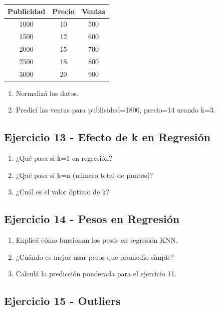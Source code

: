 \documentclass[12pt]{article}
\begin{document}
\begin{table}[H]
    \centering
    \begin{tabular}{ccc}
        \toprule
        \textbf{Publicidad} & \textbf{Precio} & \textbf{Ventas} \\
        \midrule
        1000 & 10 & 500 \\
        1500 & 12 & 600 \\
        2000 & 15 & 700 \\
        2500 & 18 & 800 \\
        3000 & 20 & 900 \\
        \bottomrule
    \end{tabular}
\end{table}

\begin{enumerate}
    \item Normalizá los datos.
    \item Predicí las ventas para publicidad=1800, precio=14 usando k=3.
\end{enumerate}

\subsection{Ejercicio 13 - Efecto de k en Regresión}

\begin{enumerate}
    \item ¿Qué pasa si k=1 en regresión?
    \item ¿Qué pasa si k=n (número total de puntos)?
    \item ¿Cuál es el valor óptimo de k?
\end{enumerate}

\subsection{Ejercicio 14 - Pesos en Regresión}

\begin{enumerate}
    \item Explicá cómo funcionan los pesos en regresión KNN.
    \item ¿Cuándo es mejor usar pesos que promedio simple?
    \item Calculá la predicción ponderada para el ejercicio 11.
\end{enumerate}

\subsection{Ejercicio 15 - Outliers}
\end{document}
